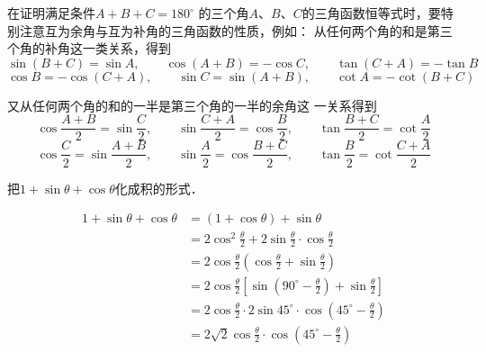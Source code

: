 \begin{rmk}
    在证明满足条件$A+B+C=180^{\circ}$ 的三个角$A$、$B$、$C$的三角函数恒等式时，要特别注意互为余角与互为补角的三角函数的性质，例如：    
从任何两个角的和是第三个角的补角这一类关系，得到
\[\sin (B+C) =\sin A,\qquad  \cos (A+B) = - \cos C,\qquad \tan (C+A) =-\tan B\]
\[\cos B= -\cos (C+A),\qquad \sin C=\sin (A+B) ,\qquad  \cot A=-\cot (B+C)\]

又从任何两个角的和的一半是第三个角的一半的余角这
一关系得到
\[\cos\frac{A+B}{2}=\sin\frac{C}{2},\qquad \sin\frac{C+A}{2}=\cos\frac{B}{2},\qquad \tan\frac{B+C}{2}=\cot\frac{A}{2}\]
\[\cos\frac{C}{2}=\sin\frac{A+B}{2},\qquad \sin\frac{A}{2}=\cos\frac{B+C}{2},\qquad \tan\frac{B}{2}=\cot\frac{C+A}{2}\]
\end{rmk}


\begin{example}
    把$1+\sin\theta+\cos\theta$化成积的形式．
\end{example}

\begin{solution}
\[\begin{split}
1+\sin\theta+\cos\theta&=(1+\cos\theta)+\sin\theta\\
&=2\cos^2\frac{\theta}{2}+2\sin\frac{\theta}{2}\cdot \cos\frac{\theta}{2}\\
&=2\cos\frac{\theta}{2}\left(\cos\frac{\theta}{2}+\sin\frac{\theta}{2}\right)\\
&=2\cos\frac{\theta}{2}\left[\sin\left(90^{\circ}-\frac{\theta}{2}\right)+\sin \frac{\theta}{2}\right]\\
&=2\cos\frac{\theta}{2}\cdot 2\sin 45^{\circ}\cdot \cos\left(45^{\circ}-\frac{\theta}{2}\right)\\
&=2\sqrt{2}\cos \frac{\theta}{2}\cdot \cos\left(45^{\circ}-\frac{\theta}{2}\right)
\end{split}\]
\end{solution}

